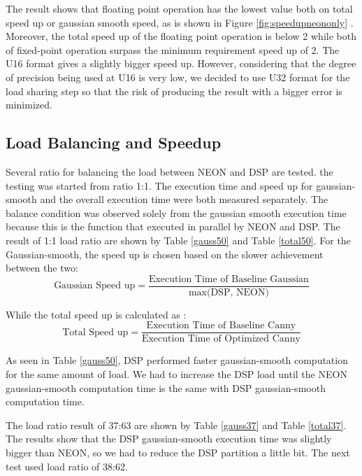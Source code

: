 \documentclass[conference]{IEEEtran}
\begin{document}
The result shows that floating point operation has the lowest value both on total speed up or gaussian smooth speed, as is shown in Figure \ref{fig:speedupneononly} . Moreover, the total speed up of the floating point operation is below 2 while both of fixed-point operation surpass the minimum requirement speed up of 2. The U16 format gives a slightly bigger speed up. However, considering that the degree of precision being used at U16 is very low, we decided to use U32 format for the load sharing step so that the risk of producing the result with a bigger error is minimized.

\subsection{Load Balancing and Speedup}

Several ratio for balancing the load between NEON and DSP are tested. the testing was started from ratio 1:1. The execution time and speed up for gaussian-smooth and the overall execution time were both measured separately. The balance condition was observed solely from the gaussian smooth execution time because this is the function that  executed in parallel by NEON and DSP. The result of 1:1 load ratio are shown by Table \ref{gauss50} and Table \ref{total50}. For the Gaussian-smooth, the speed up is chosen based on the slower achievement between the two:
\begin{equation*}
\text{Gaussian Speed up} = \frac{\text{Execution Time of Baseline Gaussian}}{\text{max(DSP, NEON)}}        
\end{equation*}

While the total speed up is calculated as : 
\begin{equation*}
\text{Total Speed up} = \frac{\text{Execution Time of Baseline Canny}}{\text{Execution Time of Optimized Canny}}        
\end{equation*}

As seen in Table \ref{gauss50}, DSP performed faster gaussian-smooth computation for the same amount of load. We had to increase the DSP load until the NEON gaussian-smooth computation time is the same with DSP gaussian-smooth computation time.     

The load ratio result of 37:63 are shown by Table \ref{gauss37} and Table \ref{total37}. The results show that the DSP gaussian-smooth execution time was slightly bigger than NEON, so we had to reduce the DSP partition a little bit. The next test used load ratio of 38:62. 
\end{document}
